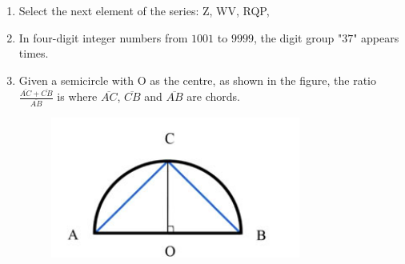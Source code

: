 \documentclass[journal,12pt,onecolumn]{IEEEtran}
\theoremstyle{remark}
\begin{document}
\begin{enumerate}[start=1, label=Q.\arabic*]
\hfill{}

\item Select the next element of the series: Z, WV, RQP, \underline{\hspace{2cm}}
    \begin{enumerate}
    \end{enumerate}

\hfill{}

\item In four-digit integer numbers from $1001$ to $9999$, the digit group "$37$"  appears \underline{\hspace{2cm}} times.
    \begin{enumerate}
    \end{enumerate}

\hfill{}

\item Given a semicircle with O as the centre, as shown in the figure, the ratio $\frac{\overline{AC}+\overline{CB}}{\overline{AB}}$ is \underline{\hspace{2cm}} where $\overline{AC}$, $\overline{CB}$ and $\overline{AB}$ are chords.
\begin{figure}[H]
    \centering
    \includegraphics[width=0.4\columnwidth]{Figures/aq9.png}
    \caption{}
\end{figure}
    \begin{enumerate}
    \end{enumerate}


\end{enumerate}
\end{document}
